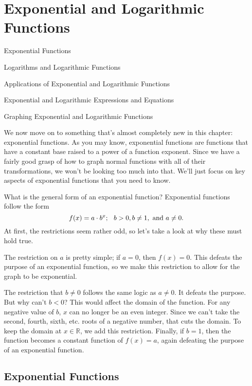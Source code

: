 \documentclass[../book.tex]{subfiles}
\begin{document}
\chapter{Exponential and Logarithmic Functions}
\begin{introduction}[Contents]
\item Exponential Functions
\item Logarithms and Logarithmic Functions
\item Applications of Exponential and Logarithmic Functions
\item Exponential and Logarithmic Expressions and Equations
\item Graphing Exponential and Logarithmic Functions
\end{introduction}
\noindent We now move on to something that's almost completely new in this chapter: exponential functions.  As you may know, exponential functions are functions that have a constant base raised to a power of a function exponent.  Since we have a fairly good grasp of how to graph normal functions with all of their transformations, we won't be looking too much into that.  We'll just focus on key aspects of exponential functions that you need to know.  

What is the general form of an exponential function?  Exponential functions follow the form $$f(x)=a\cdot b^x; \hspace{0.10in} b>0, b\neq 1, \text{ and } a\neq 0.$$
At first, the restrictions seem rather odd, so let's take a look at why these must hold true.

The restriction on $a$ is pretty simple; if $a=0$, then $f(x)=0$.  This defeats the purpose of an exponential function, so we make this restriction to allow for the graph to be exponential.

The restriction that $b\neq 0$ follows the same logic as $a\neq 0$.  It defeats the purpose.  But why can't $b<0$?  This would affect the domain of the function.  For any negative value of $b$, $x$ can no longer be an even integer.  Since we can't take the second, fourth, sixth, etc.  roots of a negative number, that cuts the domain.  To keep the domain at $x\in\mathbb{R}$, we add this restriction.  Finally, if $b=1$, then the function becomes a constant function of $f(x)=a$, again defeating the purpose of an exponential function.

\section{Exponential Functions}
\begin{wrapfigure}{r}{4cm}
\end{wrapfigure}
\end{document}
